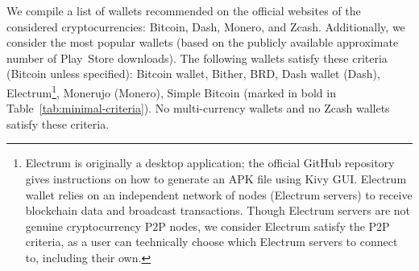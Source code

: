 We compile a list of wallets recommended on the official websites of the considered cryptocurrencies: Bitcoin, Dash, Monero, and Zcash.
Additionally, we consider the most popular wallets (based on the publicly available approximate number of Play~Store downloads).
The following wallets satisfy these criteria (Bitcoin unless specified): Bitcoin wallet, Bither, BRD, Dash wallet (Dash), Electrum\footnote{Electrum is originally a desktop application; the official GitHub repository gives instructions on how to generate an APK file using Kivy GUI\@. Electrum wallet relies on an independent network of nodes (Electrum servers) to receive blockchain data and broadcast transactions. Though Electrum servers are not genuine cryptocurrency P2P nodes, we consider Electrum satisfy the P2P criteria, as a user can technically choose which Electrum servers to connect to, including their own.}, Monerujo (Monero), Simple Bitcoin (marked in bold in Table~\ref{tab:minimal-criteria}).
No multi-currency wallets and no Zcash wallets satisfy these criteria.

